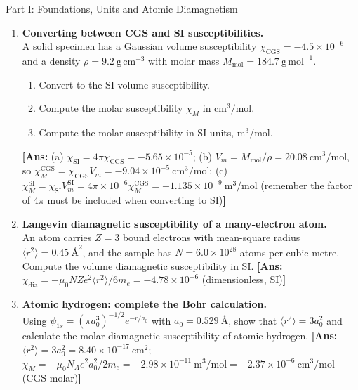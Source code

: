 \documentclass[11pt,a4paper]{article}
\newcommand{\Ang}{\text{\AA}}
\begin{document}
\begin{assignmentbox}{Part I: Foundations, Units and Atomic Diamagnetism}
\begin{enumerate}[label=\textbf{I.\arabic*.}, leftmargin=*]
    \item \textbf{Converting between CGS and SI susceptibilities.}\\
    A solid specimen has a Gaussian volume susceptibility $\chi_{\mathrm{CGS}} = -4.5\times10^{-6}$ and a density $\rho = 9.2\ \mathrm{g\,cm^{-3}}$ with molar mass $M_{\mathrm{mol}} = 184.7\ \mathrm{g\,mol^{-1}}$.
    \begin{enumerate}[label=(\alph*)]
        \item Convert to the SI volume susceptibility.
        \item Compute the molar susceptibility $\chi_M$ in $\mathrm{cm^3/mol}$.
        \item Compute the molar susceptibility in SI units, $\mathrm{m^3/mol}$.
    \end{enumerate}
    \textbf{[Ans:} (a) $\chi_{\mathrm{SI}} = 4\pi\chi_{\mathrm{CGS}} = -5.65\times10^{-5}$; (b) $V_m = M_{\mathrm{mol}}/\rho = 20.08\ \mathrm{cm^3/mol}$, so $\chi_M^{\mathrm{CGS}} = \chi_{\mathrm{CGS}}V_m = -9.04\times10^{-5}\ \mathrm{cm^3/mol}$; (c) $\chi_M^{\mathrm{SI}} = \chi_{\mathrm{SI}}V_m^{\mathrm{SI}} = 4\pi\times 10^{-6}\chi_M^{\mathrm{CGS}} = -1.135\times10^{-9}\ \mathrm{m^3/mol}$ (remember the factor of $4\pi$ must be included when converting to SI)\textbf{]}

    \item \textbf{Langevin diamagnetic susceptibility of a many-electron atom.}\\
    An atom carries $Z = 3$ bound electrons with mean-square radius $\langle r^2\rangle = 0.45\ \Ang^2$, and the sample has $N = 6.0\times10^{28}$ atoms per cubic metre. Compute the volume diamagnetic susceptibility in SI.
    \textbf{[Ans:} $\chi_{\mathrm{dia}} = -\mu_0 NZ e^2\langle r^2\rangle/6m_e = -4.78\times10^{-6}$ (dimensionless, SI)\textbf{]}

    \item \textbf{Atomic hydrogen: complete the Bohr calculation.}\\
    Using $\psi_{1s} = (\pi a_0^3)^{-1/2}e^{-r/a_0}$ with $a_0 = 0.529\ \Ang$, show that $\langle r^2\rangle = 3a_0^2$ and calculate the molar diamagnetic susceptibility of atomic hydrogen.
    \textbf{[Ans:} $\langle r^2\rangle = 3a_0^2 = 8.40\times10^{-17}\ \mathrm{cm^2}$; $\chi_M = -\mu_0 N_A e^2a_0^2/2m_e = -2.98\times10^{-11}\ \mathrm{m^3/mol} = -2.37\times10^{-6}\ \mathrm{cm^3/mol}$ (CGS molar)\textbf{]}


\end{enumerate}
\end{assignmentbox}
\end{document}
